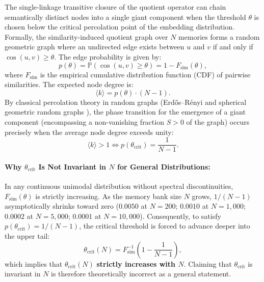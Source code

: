 \documentclass[11pt,a4paper]{article}
\theoremstyle{definition}
\begin{document}
The single-linkage transitive closure of the quotient operator can chain semantically distinct nodes into a single giant component when the threshold $\theta$ is chosen below the critical percolation point of the embedding distribution. Formally, the similarity-induced quotient graph over $N$ memories forms a random geometric graph where an undirected edge exists between $u$ and $v$ if and only if $\cos(u, v) \ge \theta$. The edge probability is given by:
\[
p(\theta) = \mathbb{P}(\cos(u, v) \ge \theta) = 1 - F_{\mathrm{sim}}(\theta),
\]
where $F_{\mathrm{sim}}$ is the empirical cumulative distribution function (CDF) of pairwise similarities. The expected node degree is:
\[
\langle k \rangle = p(\theta) \cdot (N - 1).
\]
By classical percolation theory in random graphs (Erd\H{o}s--R\'enyi and spherical geometric random graphs \cite{penrose2003random}), the phase transition for the emergence of a giant component (encompassing a non-vanishing fraction $S > 0$ of the graph) occurs precisely when the average node degree exceeds unity:
\[
\langle k \rangle > 1 \iff p(\theta_{\mathrm{crit}}) = \frac{1}{N - 1}.
\]

\paragraph{Why $\theta_{\mathrm{crit}}$ Is Not Invariant in $N$ for General Distributions:}
In any continuous unimodal distribution without spectral discontinuities, $F_{\mathrm{sim}}(\theta)$ is strictly increasing. As the memory bank size $N$ grows, $1/(N - 1)$ asymptotically shrinks toward zero ($0.0050$ at $N = 200$; $0.0010$ at $N = 1{,}000$; $0.0002$ at $N = 5{,}000$; $0.0001$ at $N = 10{,}000$). Consequently, to satisfy $p(\theta_{\mathrm{crit}}) = 1/(N - 1)$, the critical threshold is forced to advance deeper into the upper tail:
\[
\theta_{\mathrm{crit}}(N) = F_{\mathrm{sim}}^{-1}\left(1 - \frac{1}{N - 1}\right),
\]
which implies that $\theta_{\mathrm{crit}}(N)$ \textbf{strictly increases with $N$}. Claiming that $\theta_{\mathrm{crit}}$ is invariant in $N$ is therefore theoretically incorrect as a general statement.
\end{document}
